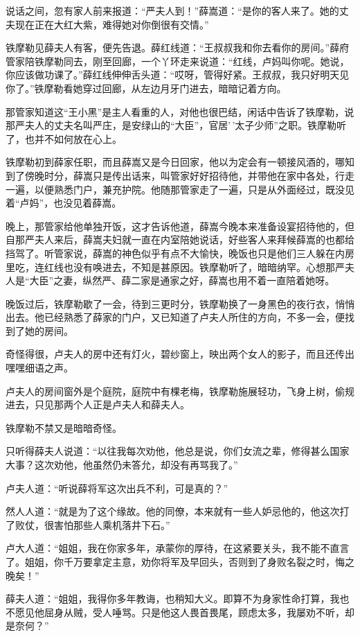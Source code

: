 \documentclass[12pt,oneside]{book}
\begin{document}
说话之间，忽有家人前来报道：``严夫人到！''薛嵩道：``是你的客人来了。她的丈夫现在正在大红大紫，难得她对你倒很有交情。''

铁摩勒见薛夫人有客，便先告退。薛红线道：``王叔叔我和你去看你的房间。''薛府管家陪铁摩勒同去，刚至回廊，一个丫环走来说道：``红线，卢妈叫你呢。她说，你应该做功课了。''薛红线伸伸舌头道：``哎呀，管得好紧。王叔叔，我只好明天见你了。''铁摩勒看她穿过回廊，从左边月牙门进去，暗暗记着方向。

那管家知道这``王小黑''是主人看重的人，对他也很巴结，闲话中告诉了铁摩勒，说那严夫人的丈夫名叫严庄，是安绿山的``大臣''，官居'\,'太子少师''之职。铁摩勒听了，也并不如何放在心上。

铁摩勒初到薛家任职，而且薛嵩又是今日回家，他以为定会有一顿接风酒的，哪知到了傍晚时分，薛嵩只是传出话来，叫管家好好招待他，并带他在家中各处，行走一遍，以便熟悉门户，兼充护院。他随那管家走了一遍，只是从外面经过，既没见着``卢妈''，也没见着薛嵩。

晚上，那管家给他单独开饭，这才告诉他道，薛嵩今晚本来准备设宴招待他的，但自那严夫人来后，薛嵩夫妇就一直在内室陪她说话，好些客人来拜候薛嵩的也都给挡驾了。听管家说，薛嵩的神色似乎有点不大愉快，晚饭也只是他们三人躲在内房里吃，连红线也没有唤进去，不知是甚原因。铁摩勒听了，暗暗纳罕。心想那严夫人是``大臣''之妻，纵然严、薛二家是通家之好，薛嵩也用不着一直陪着她呀。

晚饭过后，铁摩勒歇了一会，待到三更时分，铁摩勒换了一身黑色的夜行衣，悄悄出去。他已经熟悉了薛家的门户，又已知道了卢夫人所住的方向，不多一会，便找到了她的房间。

奇怪得很，卢夫人的房中还有灯火，碧纱窗上，映出两个女人的影子，而且还传出嘿嘿细语之声。

卢夫人的房间窗外是个庭院，庭院中有棵老梅，铁摩勒施展轻功，飞身上树，偷规进去，只见那两个人正是卢夫人和薛夫人。

铁摩勒不禁又是暗暗奇怪。

只听得薛夫人说道：``以往我每次劝他，他总是说，你们女流之辈，修得甚么国家大事？这次劝他，他虽然仍未答允，却没有再骂我了。''

卢夫人道：``听说薛将军这次出兵不利，可是真的？''

然人人道：``就是为了这个缘故。他的同僚，本来就有一些人妒忌他的，他这次打了败仗，很害怕那些人乘机落井下石。''

卢大人道：``姐姐，我在你家多年，承蒙你的厚待，在这紧要关头，我不能不直言了。姐姐，你千万要拿定主意，劝你将军及早回头，否则到了身败名裂之时，悔之晚矣！''

薛夫人道：``姐姐，我得你多年教诲，也稍知大义。即算不为身家性命打算，我也不愿见他屈身从贼，受人唾骂。只是他这人畏首畏尾，顾虑太多，我屡劝不听，却是奈何？''
\end{document}

